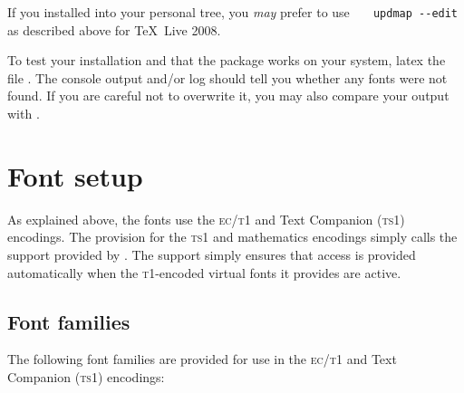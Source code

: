 \documentclass[11pt,british]{article}
\begin{document}
If you installed into your personal tree, you \emph{may} prefer to use \verb|	updmap --edit| as described above for \TeX~Live 2008.

To test your installation and that the package works on your system, latex the file . The console output and/or log should tell you whether any fonts were not found. If you are careful not to overwrite it, you may also compare your output with .

\section{Font setup}

As explained above, the fonts use the \textsc{ec}/\textsc{t1} and Text Companion (\textsc{ts1}) encodings. The provision for the \textsc{ts1} and mathematics encodings simply calls the support provided by . The  support simply ensures that access is provided automatically when the \textsc{t1}-encoded virtual fonts it provides are active.

\subsection{Font families}

The following font families are provided for use in the \textsc{ec}/\textsc{t1} and Text Companion (\textsc{ts1}) encodings:
\end{document}
